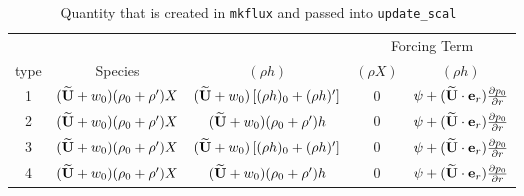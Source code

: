 \documentclass[11pt]{article}
\def\ut    {\widetilde{\bf U}}
\def\er    {{\bf e}_r}
\begin{document}
\begin{table*}
\begin{center}
\caption{Quantity that is created in {\tt mkflux} and passed into {\tt update\_scal}\newline\
}
\begin{tabular}{c|c|c|c|c}
       &            &              &\multicolumn{2}{c}{Forcing Term} \\
{type} & {Species } & {$(\rho h)$} & {$(\rho X)$} & {$(\rho h)$} \\
\hline 
1 & $(\ut+w_0)(\rho_0+\rho^\prime) X          $ & $(\ut+w_0)\left [(\rho h)_0 + (\rho h)^\prime\right]$ & 0 & $ \psi + (\ut \cdot \er) \frac{\partial p_0}{\partial r} $ \\[2mm]
2 & $(\ut+w_0)(\rho_0+\rho^\prime) X          $ & $(\ut+w_0) (\rho_0+\rho^\prime) h$ & 0 & $ \psi + (\ut \cdot \er) \frac{\partial p_0}{\partial r} $ \\[2mm]
3 & $(\ut+w_0)(\rho_0+\rho^\prime) X          $ & $(\ut+w_0)\left [(\rho h)_0 + (\rho h)^\prime\right]$ & 0 & $ \psi + (\ut \cdot \er) \frac{\partial p_0}{\partial r}$ \\[2mm]
4 & $(\ut+w_0)(\rho_0+\rho^\prime) X          $ & $(\ut+w_0) (\rho_0+\rho^\prime) h$ & 0 & $ \psi + (\ut \cdot \er) \frac{\partial p_0}{\partial r} $ \\[2mm]
\hline
\end{tabular}
\end{center}
\end{table*}
\end{document}
